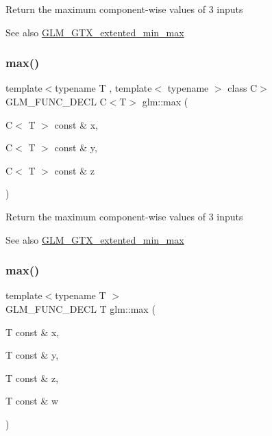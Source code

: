 Return the maximum component-\/wise values of 3 inputs \begin{DoxySeeAlso}{See also}
\hyperlink{group__gtx__extented__min__max}{G\+L\+M\+\_\+\+G\+T\+X\+\_\+extented\+\_\+min\+\_\+max} 
\end{DoxySeeAlso}
\mbox{\label{group__gtx__extented__min__max_gaf832e9d4ab4826b2dda2fda25935a3a4}} 
\subsubsection{\texorpdfstring{max()}{max()}\hspace{0.1cm}{\footnotesize\ttfamily [3/6]}}
{\footnotesize\ttfamily template$<$typename T , template$<$ typename $>$ class C$>$ \\
G\+L\+M\+\_\+\+F\+U\+N\+C\+\_\+\+D\+E\+CL C$<$T$>$ glm\+::max (\begin{DoxyParamCaption}\item[{C$<$ T $>$ const \&}]{x,  }\item[{C$<$ T $>$ const \&}]{y,  }\item[{C$<$ T $>$ const \&}]{z }\end{DoxyParamCaption})}

Return the maximum component-\/wise values of 3 inputs \begin{DoxySeeAlso}{See also}
\hyperlink{group__gtx__extented__min__max}{G\+L\+M\+\_\+\+G\+T\+X\+\_\+extented\+\_\+min\+\_\+max} 
\end{DoxySeeAlso}
\mbox{\label{group__gtx__extented__min__max_ga78e04a0cef1c4863fcae1a2130500d87}} 
\subsubsection{\texorpdfstring{max()}{max()}\hspace{0.1cm}{\footnotesize\ttfamily [4/6]}}
{\footnotesize\ttfamily template$<$typename T $>$ \\
G\+L\+M\+\_\+\+F\+U\+N\+C\+\_\+\+D\+E\+CL T glm\+::max (\begin{DoxyParamCaption}\item[{T const \&}]{x,  }\item[{T const \&}]{y,  }\item[{T const \&}]{z,  }\item[{T const \&}]{w }\end{DoxyParamCaption})}

